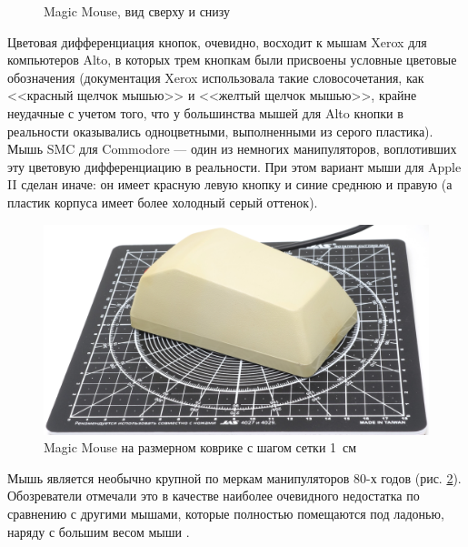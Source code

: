 \documentclass[11pt, a4paper]{article}
\begin{document}
\begin{figure}[h]
    \caption{Magic Mouse, вид сверху и снизу}
    \label{fig:MagicMouseTopAndBottom}
\end{figure}

Цветовая дифференциация кнопок, очевидно, восходит к мышам Xerox для компьютеров Alto, в которых трем кнопкам были присвоены условные цветовые обозначения (документация Xerox использовала такие словосочетания, как <<красный щелчок мышью>> и <<желтый щелчок мышью>>, крайне неудачные с учетом того, что у большинства мышей для Alto кнопки в реальности оказывались одноцветными, выполненными из серого пластика). Мышь SMC для Commodore --- один из немногих манипуляторов, воплотивших эту цветовую дифференциацию в реальности. При этом вариант мыши для Apple II сделан иначе: он имеет красную левую кнопку и синие среднюю и правую (а пластик корпуса имеет более холодный серый оттенок).

\begin{figure}[h]
    \centering
    \includegraphics[scale=0.51]{1985_smc_contriver_magic_mouse/size_30.jpg}
    \caption{Magic Mouse на размерном коврике с шагом сетки 1~см}
    \label{fig:MagicMouseSize}
\end{figure}

Мышь является необычно крупной по меркам манипуляторов 80-х годов (рис. \ref{fig:MagicMouseSize}). Обозреватели отмечали это в качестве наиболее очевидного недостатка по сравнению с другими мышами, которые полностью помещаются под ладонью, наряду с большим весом мыши \cite{SMC_Mouse_Commodore3}.
\end{document}
